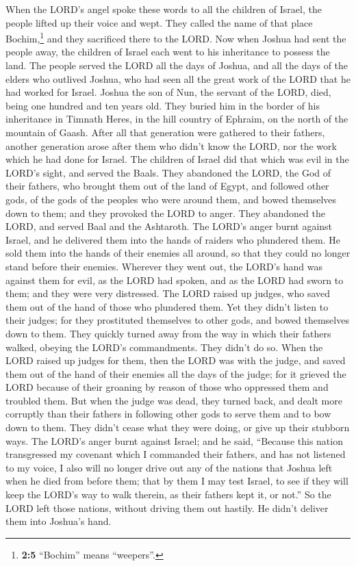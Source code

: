  When the LORD's angel spoke these words to all the
children of Israel, the people lifted up their voice and wept.
 They called the name of that place Bochim,\footnote{\textbf{2:5}
  ``Bochim'' means ``weepers''.} and they sacrificed there to the LORD.
 Now when Joshua had sent the people away, the children of
Israel each went to his inheritance to possess the land. 
The people served the LORD all the days of Joshua, and all the days of
the elders who outlived Joshua, who had seen all the great work of the
LORD that he had worked for Israel.  Joshua the son of
Nun, the servant of the LORD, died, being one hundred and ten years old.
 They buried him in the border of his inheritance in
Timnath Heres, in the hill country of Ephraim, on the north of the
mountain of Gaash.  After all that generation were
gathered to their fathers, another generation arose after them who
didn't know the LORD, nor the work which he had done for Israel.
 The children of Israel did that which was evil in the
LORD's sight, and served the Baals.  They abandoned the
LORD, the God of their fathers, who brought them out of the land of
Egypt, and followed other gods, of the gods of the peoples who were
around them, and bowed themselves down to them; and they provoked the
LORD to anger.  They abandoned the LORD, and served Baal
and the Ashtaroth.  The LORD's anger burnt against
Israel, and he delivered them into the hands of raiders who plundered
them. He sold them into the hands of their enemies all around, so that
they could no longer stand before their enemies. 
Wherever they went out, the LORD's hand was against them for evil, as
the LORD had spoken, and as the LORD had sworn to them; and they were
very distressed.  The LORD raised up judges, who saved
them out of the hand of those who plundered them.  Yet
they didn't listen to their judges; for they prostituted themselves to
other gods, and bowed themselves down to them. They quickly turned away
from the way in which their fathers walked, obeying the LORD's
commandments. They didn't do so.  When the LORD raised up
judges for them, then the LORD was with the judge, and saved them out of
the hand of their enemies all the days of the judge; for it grieved the
LORD because of their groaning by reason of those who oppressed them and
troubled them.  But when the judge was dead, they turned
back, and dealt more corruptly than their fathers in following other
gods to serve them and to bow down to them. They didn't cease what they
were doing, or give up their stubborn ways.  The LORD's
anger burnt against Israel; and he said, ``Because this nation
transgressed my covenant which I commanded their fathers, and has not
listened to my voice,  I also will no longer drive out
any of the nations that Joshua left when he died from before them;
 that by them I may test Israel, to see if they will keep
the LORD's way to walk therein, as their fathers kept it, or not.''
 So the LORD left those nations, without driving them out
hastily. He didn't deliver them into Joshua's hand.

